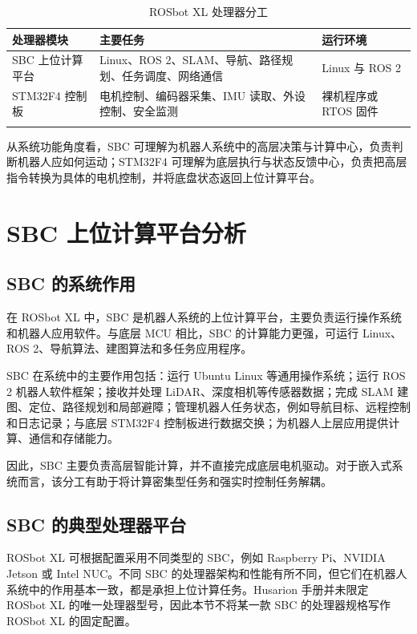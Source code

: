 \documentclass[UTF8,a4paper,12pt]{ctexrep}
\begin{document}
\begin{table}[H]
  \centering
  \caption{ROSbot XL 处理器分工}
  \label{tab:processor-division}
  \small
  \begin{tabularx}{\textwidth}{L{3.4cm}Y L{3.2cm}}
    \toprule
    \textbf{处理器模块} & \textbf{主要任务} & \textbf{运行环境} \\
    \midrule
    SBC 上位计算平台 & Linux、ROS 2、SLAM、导航、路径规划、任务调度、网络通信 & Linux 与 ROS 2 \\
    STM32F4 控制板 & 电机控制、编码器采集、IMU 读取、外设控制、安全监测 & 裸机程序或 RTOS 固件 \\
    \bottomrule
  \end{tabularx}
\end{table}

从系统功能角度看，SBC 可理解为机器人系统中的高层决策与计算中心，负责判断机器人应如何运动；STM32F4 可理解为底层执行与状态反馈中心，负责把高层指令转换为具体的电机控制，并将底盘状态返回上位计算平台。

\section{SBC 上位计算平台分析}

\subsection{SBC 的系统作用}

在 ROSbot XL 中，SBC 是机器人系统的上位计算平台，主要负责运行操作系统和机器人应用软件。与底层 MCU 相比，SBC 的计算能力更强，可运行 Linux、ROS 2、导航算法、建图算法和多任务应用程序。

SBC 在系统中的主要作用包括：运行 Ubuntu Linux 等通用操作系统；运行 ROS 2 机器人软件框架；接收并处理 LiDAR、深度相机等传感器数据；完成 SLAM 建图、定位、路径规划和局部避障；管理机器人任务状态，例如导航目标、远程控制和日志记录；与底层 STM32F4 控制板进行数据交换；为机器人上层应用提供计算、通信和存储能力。

因此，SBC 主要负责高层智能计算，并不直接完成底层电机驱动。对于嵌入式系统而言，该分工有助于将计算密集型任务和强实时控制任务解耦。

\subsection{SBC 的典型处理器平台}

ROSbot XL 可根据配置采用不同类型的 SBC，例如 Raspberry Pi、NVIDIA Jetson 或 Intel NUC。不同 SBC 的处理器架构和性能有所不同，但它们在机器人系统中的作用基本一致，都是承担上位计算任务。Husarion 手册并未限定 ROSbot XL 的唯一处理器型号，因此本节不将某一款 SBC 的处理器规格写作 ROSbot XL 的固定配置。
\end{document}
